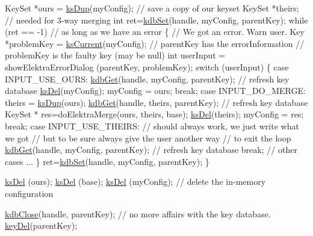 \begin{DoxyCodeInclude}
KeySet *ours = \hyperlink{group__keyset_gac59e4b328245463f1451f68d5106151c}{ksDup}(myConfig); \textcolor{comment}{// save a copy of our keyset}
KeySet *theirs; \textcolor{comment}{// needed for 3-way merging}
\textcolor{keywordtype}{int} ret=\hyperlink{group__kdb_ga11436b058408f83d303ca5e996832bcf}{kdbSet}(handle, myConfig, parentKey);
\textcolor{keywordflow}{while} (ret == -1) \textcolor{comment}{// as long as we have an error}
\{
        \textcolor{comment}{// We got an error. Warn user.}
        Key *problemKey = \hyperlink{group__keyset_ga4287b9416912c5f2ab9c195cb74fb094}{ksCurrent}(myConfig);
        \textcolor{comment}{// parentKey has the errorInformation}
        \textcolor{comment}{// problemKey is the faulty key (may be null)}
        \textcolor{keywordtype}{int} userInput = showElektraErrorDialog (parentKey, problemKey);
        \textcolor{keywordflow}{switch} (userInput)
        \{
        \textcolor{keywordflow}{case} INPUT\_USE\_OURS:
                \hyperlink{group__kdb_ga28e385fd9cb7ccfe0b2f1ed2f62453a1}{kdbGet}(handle, myConfig, parentKey); \textcolor{comment}{// refresh key database}
                \hyperlink{group__keyset_ga27e5c16473b02a422238c8d970db7ac8}{ksDel}(myConfig);
                myConfig = ours;
                \textcolor{keywordflow}{break};
        \textcolor{keywordflow}{case} INPUT\_DO\_MERGE:
                theirs = \hyperlink{group__keyset_gac59e4b328245463f1451f68d5106151c}{ksDup}(ours);
                \hyperlink{group__kdb_ga28e385fd9cb7ccfe0b2f1ed2f62453a1}{kdbGet}(handle, theirs, parentKey); \textcolor{comment}{// refresh key database}
                KeySet * res=doElektraMerge(ours, theirs, base);
                \hyperlink{group__keyset_ga27e5c16473b02a422238c8d970db7ac8}{ksDel}(theirs);
                myConfig = res;
                \textcolor{keywordflow}{break};
        \textcolor{keywordflow}{case} INPUT\_USE\_THEIRS:
                \textcolor{comment}{// should always work, we just write what we got}
                \textcolor{comment}{// but to be sure always give the user another way}
                \textcolor{comment}{// to exit the loop}
                \hyperlink{group__kdb_ga28e385fd9cb7ccfe0b2f1ed2f62453a1}{kdbGet}(handle, myConfig, parentKey); \textcolor{comment}{// refresh key database}
                \textcolor{keywordflow}{break};
        \textcolor{comment}{// other cases ...}
        \}
        ret=\hyperlink{group__kdb_ga11436b058408f83d303ca5e996832bcf}{kdbSet}(handle, myConfig, parentKey);
\}

\hyperlink{group__keyset_ga27e5c16473b02a422238c8d970db7ac8}{ksDel} (ours);
\hyperlink{group__keyset_ga27e5c16473b02a422238c8d970db7ac8}{ksDel} (base);
\hyperlink{group__keyset_ga27e5c16473b02a422238c8d970db7ac8}{ksDel} (myConfig); \textcolor{comment}{// delete the in-memory configuration}

\hyperlink{group__kdb_gadb54dc9fda17ee07deb9444df745c96f}{kdbClose}(handle, parentKey); \textcolor{comment}{// no more affairs with the key database.}
\hyperlink{group__key_ga3df95bbc2494e3e6703ece5639be5bb1}{keyDel}(parentKey);
\end{DoxyCodeInclude}

